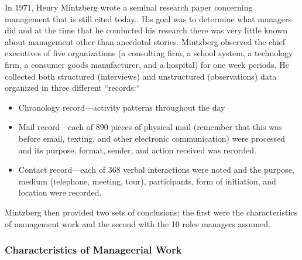 In $ 1971 $, Henry Mintzberg wrote a seminal research paper concerning management that is still cited today.\cite{mintzberg1971managerial}. His goal was to determine what managers did and at the time that he conducted his research there was very little known about management other than anecdotal stories. Mintzberg observed the chief executives of five organizations (a consulting firm, a school system, a technology firm, a consumer goods manufacturer, and a hospital) for one week periods. He collected both structured (interviews) and unstructured (observations) data organized in three different ``records:``

\begin{itemize}
	\item Chronology record---activity patterns throughout the day
	\item Mail record---each of $ 890 $ pieces of physical mail (remember that this was before email, texting, and other electronic communication) were processed and its purpose, format, sender, and action received was recorded.
	\item Contact record---each of $ 368 $ verbal interactions were noted and the purpose, medium (telephone, meeting, tour), participants, form of initiation, and location were recorded.
\end{itemize}

Mintzberg then provided two sets of conclusions; the first were the characteristics of management work and the second with the 10 roles managers assumed.

\subsubsection{Characteristics of Manageerial Work}

